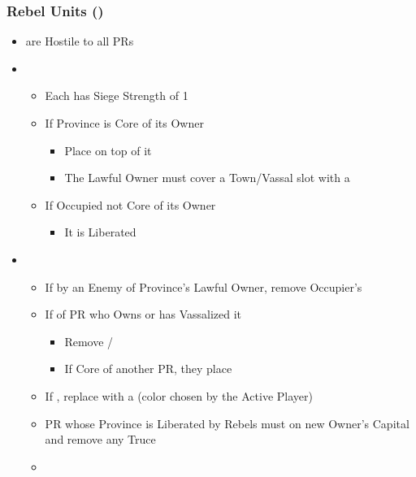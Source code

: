 \documentclass[10pt]{article}
\begin{document}
\subsubsection*{Rebel Units (\rebel)}
\begin{itemize}
	\item \rebels are Hostile to all PRs
	\item {}
	\begin{itemize}
		\item Each \rebel has Siege Strength of 1
		\item If Province is Core of its Owner
		\begin{itemize}
			\item Place \rebeltown on top of it
			\item The Lawful Owner must cover a Town/Vassal slot with a \cube
		\end{itemize}
		\item If Occupied  not Core of its Owner
		\begin{itemize}
			\item It is Liberated
		\end{itemize}
	\end{itemize}
	\item {}
	\begin{itemize}
		\item If  by an Enemy of Province's Lawful Owner, remove Occupier's \town
		\item If  of PR who Owns or has Vassalized it
		\begin{itemize}
			\item Remove \town/\vassal
			\item If Core of another PR, they place \town
		\end{itemize}
		\item If , replace \town with a \dnpr (color chosen by the Active Player)
		\item PR whose Province is Liberated by Rebels must  on new Owner's Capital and remove any Truce
		\item {}
	\end{itemize}
\end{itemize}
\end{document}
